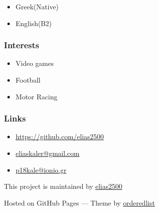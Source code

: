 \documentclass[american,]{article}
\providecommand{\tightlist}{%
  \setlength{\itemsep}{0pt}\setlength{\parskip}{0pt}}
\begin{document}
\begin{itemize}
\item
  Greek(Native)
\item
  English(B2)
\end{itemize}

\hypertarget{interests}{%
\subsubsection{Interests}\label{interests}}

\begin{itemize}
\item
  Video games
\item
  Football
\item
  Motor Racing
\end{itemize}

\hypertarget{links}{%
\subsubsection{Links}\label{links}}

\begin{itemize}
\tightlist
\item
  \url{https://github.com/elias2500}
\item
  \url{eliaskaler@gmail.com}
\item
  \url{p18kale@ionio.gr}
\end{itemize}

This project is maintained by
\href{https://github.com/elias2500}{elias2500}

{Hosted on GitHub Pages --- Theme by
\href{https://github.com/orderedlist}{orderedlist}}
\end{document}
